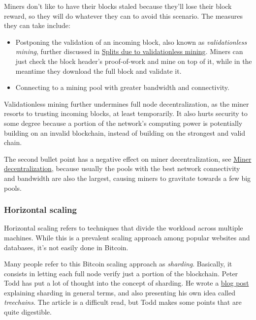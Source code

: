 Miners don't like to have their blocks staled because they'll lose their
block reward, so they will do whatever they can to avoid this scenario.
The measures they can take include:

\begin{itemize}
\item
  Postponing the validation of an incoming block, also known as
  \emph{validationless mining}, further discussed in
  \protect\hyperlink{bip66splits}{Splits due to validationless mining}.
  Miners can just check the block header's proof-of-work and mine on top
  of it, while in the meantime they download the full block and validate
  it.
\item
  Connecting to a mining pool with greater bandwidth and connectivity.
\end{itemize}

Validationless mining further undermines full node decentralization, as
the miner resorts to trusting incoming blocks, at least temporarily. It
also hurts security to some degree because a portion of the network's
computing power is potentially building on an invalid blockchain,
instead of building on the strongest and valid chain.

The second bullet point has a negative effect on miner decentralization,
see \protect\hyperlink{minerdecentralization}{Miner decentralization},
because usually the pools with the best network connectivity and
bandwidth are also the largest, causing miners to gravitate towards a
few big pools.

\hypertarget{_horizontal_scaling}{%
\subsubsection{Horizontal scaling}\label{_horizontal_scaling}}

Horizontal scaling refers to techniques that divide the workload across
multiple machines. While this is a prevalent scaling approach among
popular websites and databases, it's not easily done in Bitcoin.

Many people refer to this Bitcoin scaling approach as \emph{sharding}.
Basically, it consists in letting each full node verify just a portion
of the blockchain. Peter Todd has put a lot of thought into the concept
of sharding. He wrote a
\href{https://petertodd.org/2015/why-scaling-bitcoin-with-sharding-is-very-hard}{blog
post} explaining sharding in general terms, and also presenting his own
idea called \emph{treechains}. The article is a difficult read, but Todd
makes some points that are quite digestible.

